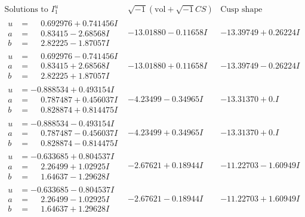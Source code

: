 \documentclass[1p]{elsarticle_modified}
\theoremstyle{definition}
\newcommand{\I}{\sqrt{-1}}
\begin{document}
$$\begin{array}{c|c|c}  
\text{Solutions to }I^u_{1}& \I (\text{vol} + \sqrt{-1}CS) & \text{Cusp shape}\\
 \hline 
\begin{aligned}
u &= \phantom{-}0.692976 + 0.741456 I \\
a &= \phantom{-}0.83415 - 2.68568 I \\
b &= \phantom{-}2.82225 - 1.87057 I\end{aligned}
 & -13.01880 - 0.11658 I & -13.39749 + 0.26224 I \\ \hline\begin{aligned}
u &= \phantom{-}0.692976 - 0.741456 I \\
a &= \phantom{-}0.83415 + 2.68568 I \\
b &= \phantom{-}2.82225 + 1.87057 I\end{aligned}
 & -13.01880 + 0.11658 I & -13.39749 - 0.26224 I \\ \hline\begin{aligned}
u &= -0.888534 + 0.493154 I \\
a &= \phantom{-}0.787487 + 0.456037 I \\
b &= \phantom{-}0.828874 + 0.814475 I\end{aligned}
 & -4.23499 - 0.34965 I & -13.31370 + 0. I\phantom{ +0.000000I} \\ \hline\begin{aligned}
u &= -0.888534 - 0.493154 I \\
a &= \phantom{-}0.787487 - 0.456037 I \\
b &= \phantom{-}0.828874 - 0.814475 I\end{aligned}
 & -4.23499 + 0.34965 I & -13.31370 + 0. I\phantom{ +0.000000I} \\ \hline\begin{aligned}
u &= -0.633685 + 0.804537 I \\
a &= \phantom{-}2.26499 + 1.02925 I \\
b &= \phantom{-}1.64637 - 1.29628 I\end{aligned}
 & -2.67621 + 0.18944 I & -11.22703 - 1.60949 I \\ \hline\begin{aligned}
u &= -0.633685 - 0.804537 I \\
a &= \phantom{-}2.26499 - 1.02925 I \\
b &= \phantom{-}1.64637 + 1.29628 I\end{aligned}
 & -2.67621 - 0.18944 I & -11.22703 + 1.60949 I \\ \hline\begin{aligned}

\end{aligned}
\end{array}$$
\end{document}
